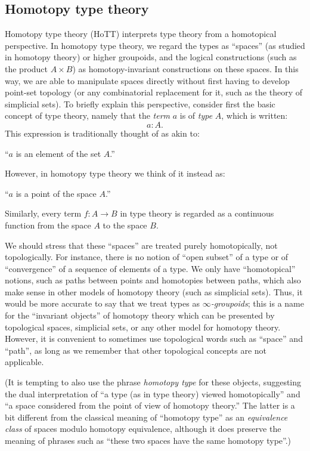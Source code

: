\subsection*{Homotopy type theory}

Homotopy type theory (HoTT) interprets type theory from a homotopical perspective.
In homotopy type theory, we regard the types as ``spaces'' (as studied in homotopy theory) or higher groupoids, and the logical constructions (such as the product $A\times B$) as homotopy-invariant constructions on these spaces.
In this way, we are able to manipulate spaces directly without first having to develop point-set topology (or any combinatorial replacement for it, such as the theory of simplicial sets).
To briefly explain this perspective, consider first the basic concept of type theory, namely that
the \emph{term} $a$ is of \emph{type} $A$, which is written:
\[ a:A. \]
This expression is traditionally thought of as akin to:
\begin{center}
``$a$ is an element of the set $A$.''
\end{center}
However, in homotopy type theory we think of it instead as:
\begin{center}
``$a$ is a point of the space $A$.''
\end{center}
Similarly, every term $f : A\to B$ in type theory is regarded as a continuous function from the space $A$ to the space $B$.

We should stress that these ``spaces'' are treated purely homotopically, not topologically.
For instance, there is no notion of ``open subset'' of a type or of ``convergence'' of a sequence of elements of a type.
We only have ``homotopical'' notions, such as paths between points and homotopies between paths, which also make sense in other models of homotopy theory (such as simplicial sets).
Thus, it would be more accurate to say that we treat types as \emph{$\infty$-groupoids}; this is a name for the ``invariant objects'' of homotopy theory which can be presented by topological spaces, simplicial sets, or any other model for homotopy theory.
However, it is convenient to sometimes use topological words such as ``space'' and ``path'', as long as we remember that other topological concepts are not applicable.

(It is tempting to also use the phrase \emph{homotopy type} for these objects, suggesting the dual interpretation of ``a type (as in type theory) viewed homotopically'' and ``a space considered from the point of view of homotopy theory.''
The latter is a bit different from the classical meaning of ``homotopy type'' as an \emph{equivalence class} of spaces modulo homotopy equivalence, although it does preserve the meaning of phrases such as ``these two spaces have the same homotopy type''.)

